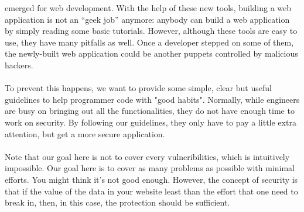 \documentclass[12pt, a4paper]{article}
\begin{document}
emerged for web development. With the help of these new tools,
building a web application is not an ``geek job'' anymore:
anybody can build a web application by simply reading some basic tutorials.
However, although these tools are easy to use,
they have many pitfalls as well.
Once a developer stepped on some of them, the newly-built web application could
be another puppets controlled by malicious hackers.
\\\\
To prevent this happens, we want to provide some simple, clear but
useful guidelines to help programmer code with "good habits".
Normally, while engineers are busy on bringing out all the functionalities,
they do not have enough time to work on security. By following our guidelines,
they only have to pay a little extra attention, but get a more secure application.
\\\\
Note that our goal here is not to cover every vulneribilities, which is intuitively impossible.
Our goal here is to cover as many problems as possible with minimal efforts.
You might think it's not good enough.
However, the concept of security is that if the value of the data in your website
least than the effort that one need to break in, then, in this case,
the protection should be sufficient.
%
%
%
\end{document}
